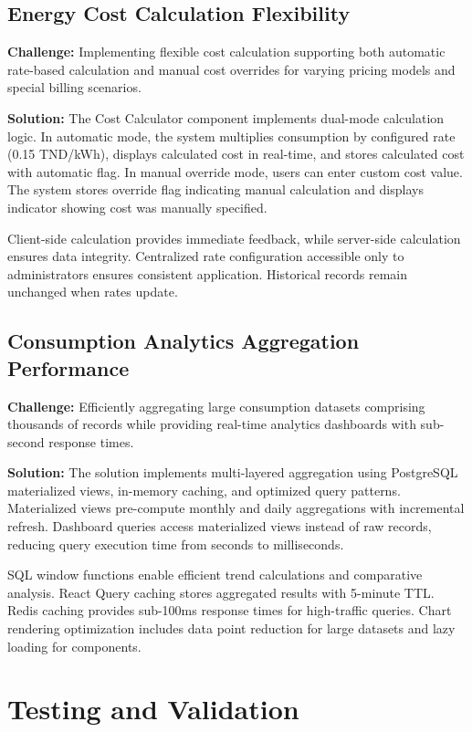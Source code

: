 \subsection{Energy Cost Calculation Flexibility}

\textbf{Challenge:} Implementing flexible cost calculation supporting both automatic rate-based calculation and manual cost overrides for varying pricing models and special billing scenarios.

\textbf{Solution:} The Cost Calculator component implements dual-mode calculation logic. In automatic mode, the system multiplies consumption by configured rate (0.15 TND/kWh), displays calculated cost in real-time, and stores calculated cost with automatic flag. In manual override mode, users can enter custom cost value. The system stores override flag indicating manual calculation and displays indicator showing cost was manually specified.

Client-side calculation provides immediate feedback, while server-side calculation ensures data integrity. Centralized rate configuration accessible only to administrators ensures consistent application. Historical records remain unchanged when rates update.

\subsection{Consumption Analytics Aggregation Performance}

\textbf{Challenge:} Efficiently aggregating large consumption datasets comprising thousands of records while providing real-time analytics dashboards with sub-second response times.

\textbf{Solution:} The solution implements multi-layered aggregation using PostgreSQL materialized views, in-memory caching, and optimized query patterns. Materialized views pre-compute monthly and daily aggregations with incremental refresh. Dashboard queries access materialized views instead of raw records, reducing query execution time from seconds to milliseconds.

SQL window functions enable efficient trend calculations and comparative analysis. React Query caching stores aggregated results with 5-minute TTL. Redis caching provides sub-100ms response times for high-traffic queries. Chart rendering optimization includes data point reduction for large datasets and lazy loading for components.

\section{Testing and Validation}


